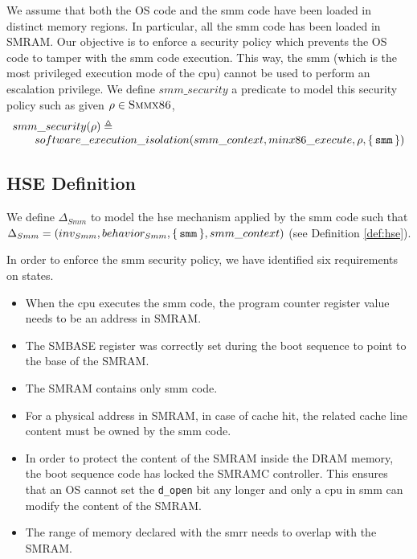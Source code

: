 We assume that both the OS code and the \ac{smm} code have been loaded in
distinct memory regions. In particular, all the \ac{smm} code has been loaded in
SMRAM.
%
Our objective is to enforce a security policy which prevents the OS code to
tamper with the \ac{smm} code execution.
%
This way, the \ac{smm} (which is the most privileged execution mode of the
\ac{cpu}) cannot be used to perform an escalation privilege.
%
We define $smm\_security$ a predicate to model this security policy such as
given $\rho \in \textsc{Smmx86}$,
%
\[
  \begin{array}{l} smm\_security(\rho) \triangleq \\
    \qquad software\_execution\_isolation(smm\_context, minx86\_execute, \rho,
    \{\,\mathtt{smm}\,\})
  \end{array}
\]

\subsection{HSE Definition}

We define $\Delta_{Smm}$ to model the \ac{hse} mechanism applied by the \ac{smm}
code such that
$\Delta_{Smm} = (inv_{Smm}, behavior_{Smm}, \{\,\mathtt{smm}\,\},
smm\_context)$ (see Definition \ref{def:hse}).

In order to enforce the \ac{smm} security policy, we have identified six
requirements on states.
\begin{itemize}
\item When the \ac{cpu} executes the \ac{smm} code, the program counter register
  value needs to be an address in SMRAM.
\item The SMBASE register was correctly set during the boot sequence to point to
  the base of the SMRAM.
\item The SMRAM contains only \ac{smm} code.
\item For a physical address in SMRAM, in case of cache hit, the related cache
  line content must be owned by the \ac{smm} code.
\item In order to protect the content of the SMRAM inside the DRAM memory, the
  boot sequence code has locked the SMRAMC controller. This ensures that an OS
  cannot set the \texttt{d\_open} bit any longer and only a \ac{cpu} in \ac{smm}
  can modify the content of the SMRAM.
\item The range of memory declared with the \ac{smrr} needs to overlap with the
  SMRAM.
\end{itemize}

